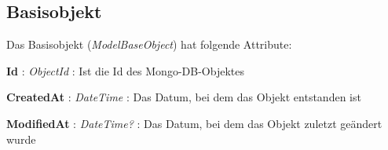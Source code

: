 \subsection{Basisobjekt}
Das Basisobjekt (\textit{ModelBaseObject}) hat folgende Attribute:

\textbf{Id} : \textit{ObjectId} : Ist die Id des Mongo-DB-Objektes

\textbf{CreatedAt} : \textit{DateTime} : Das Datum, bei dem das Objekt entstanden ist

\textbf{ModifiedAt} : \textit{DateTime?} : Das Datum, bei dem das Objekt zuletzt ge\"andert wurde
